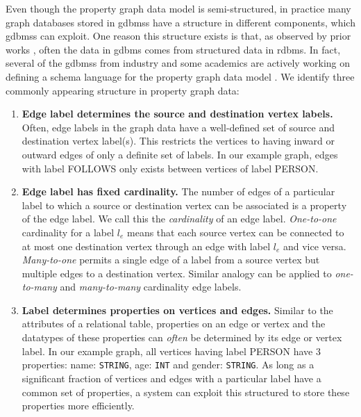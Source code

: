 \begin{guideline}
	\label{gdln:graph-schema}
	Even though the property graph data model is semi-structured, in practice many graph databases stored in \gls{gdbms}s have a structure in different components, which \gls{gdbms}s can exploit. One reason this structure exists is that, as observed by prior works \cite{survey}, often the data in \gls{gdbms} comes from structured data in \gls{rdbms}. In fact, several of the \gls{gdbms}s from industry and some academics are actively working on defining a schema language for the property graph data model \cite{schema-validation-bonifati, defining-schema-hartig}. We identify three commonly appearing structure in property graph data:
	
	
	\begin{enumerate}
		
		\item \textbf{Edge label determines the source and destination vertex labels.} Often, edge labels in the graph data have a well-defined set of source and destination vertex label(s). This restricts the vertices to having inward or outward edges of only a definite set of labels. In our example graph, edges with label FOLLOWS only exists between vertices of label PERSON.
		
		\item \textbf{Edge label has fixed cardinality.} The number of edges of a particular label to which a source or destination vertex can be associated is a property of the edge label. We call this the \emph{cardinality} of an edge label. \emph{One-to-one} cardinality for a label $l_e$ means that each source vertex can be connected to at most one destination vertex through an edge with label $l_e$ and vice versa. \emph{Many-to-one} permits a single edge of a label from a source vertex but multiple edges to a destination vertex. Similar analogy can be applied to \emph{one-to-many} and \emph{many-to-many} cardinality edge labels.
		
		\item \textbf{Label determines properties on vertices and edges.} Similar to the attributes of a relational table, properties on an edge or vertex and the datatypes of these properties can \emph{often} be determined by its edge or vertex label. In our example graph, all vertices having label PERSON have 3 properties: name: \texttt{STRING}, age: \texttt{INT} and gender: \texttt{STRING}. As long as a significant fraction of vertices and edges with a particular label have a common set of properties, a system can exploit this structured to store these properties more efficiently. 
		

\end{enumerate}
\end{guideline}
